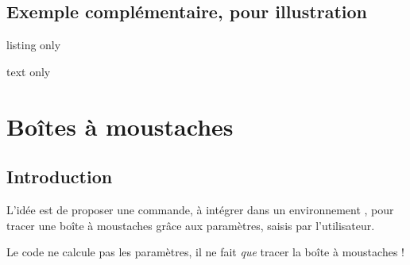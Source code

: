 \subsection{Exemple complémentaire, pour illustration}

\begin{PresCodeTexPL}{listing only}
\def\LLX{1994,1995,1996,1997,1998,1999,2000,2001,2002,2004,2005,2006,2007,2008,2009,2010}
\def\LLY{1718,1710,1708,1700,1698,1697,1691,1688,1683,1679,1671,1670,1663,1661,1656,1649}


\end{PresCodeTexPL}

\begin{PresCodeSortiePL}{text only}
\def\LLX{1994,1995,1996,1997,1998,1999,2000,2001,2002,2004,2005,2006,2007,2008,2009,2010}
\def\LLY{1718,1710,1708,1700,1698,1697,1691,1688,1683,1679,1671,1670,1663,1661,1656,1649}

\end{PresCodeSortiePL}

\newpage

\section{Boîtes à moustaches}\label{boiteamoustaches}

\subsection{Introduction}

\begin{tipblock}
L'idée est de proposer une commande, à intégrer dans un environnement \TikZ, pour tracer une boîte à moustaches grâce aux paramètres, saisis par l'utilisateur.

\smallskip

Le code ne calcule pas les paramètres, il ne fait \textit{que} tracer la boîte à moustaches !
\end{tipblock}

